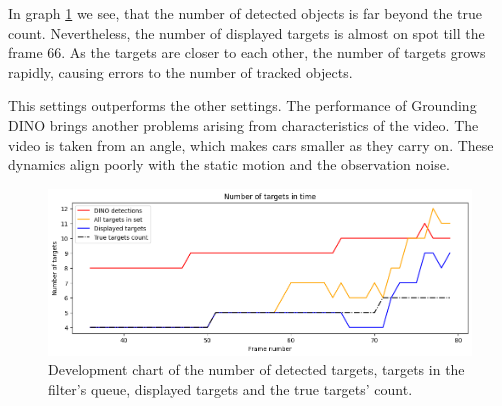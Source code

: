In graph \ref{gr:E1-V1-S3} we see, that the number of detected objects is far beyond the true count. Nevertheless,
the number of displayed targets is almost on spot till the frame 66. As the targets are closer to each
other, the
number of targets grows rapidly, causing errors to the number of tracked objects.

This settings outperforms the other settings. The performance of Grounding DINO brings another problems arising from
characteristics of the video. The video is taken from an angle, which makes cars smaller as they carry on. These
dynamics align poorly with the static motion and the observation noise.

\begin{figure}[H]
    \centering
    \includegraphics[width=\linewidth]{../../../experiments/E1/V1/DINO/dino_det}
    \caption{Development chart of the number of detected targets, targets in the filter's queue, displayed targets
    and the
    true
    targets' count.}
    \label{gr:E1-V1-S3}
\end{figure}


